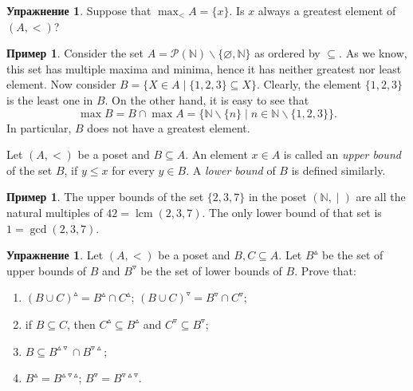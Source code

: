 \documentclass[12pt,notitlepage]{article}
\theoremstyle{plain}
\theoremstyle{definition}
\newtheorem{exc}[thm]{Упражнение}
\newtheorem{exm}[thm]{Пример}
\theoremstyle{plain}
\newcommand{\N}{\mathbb{N}}
\newcommand{\sbs}{\subseteq}
\renewcommand{\setminus}{\smallsetminus}
\newcommand{\void}{\varnothing}
\newcommand{\mP}{\mathcal{P}}
\newcommand{\1}{\mathbf{1}}
\newcommand{\0}{\mathbf{0}}
\newcommand{\dvd}{\mathop{\mid}}
\DeclareMathOperator{\lcm}{lcm}
\begin{document}
%
\begin{exc}
	Suppose that $\max_{<} A = \{x\}$. Is $x$ always a greatest element of $(A, <)$?
\end{exc}

\begin{exm}
	Consider the set $A = \mP(\N) \setminus \{\void, \N\}$ as ordered by ${\sbs}$. As we know, this set has multiple maxima and minima, hence it has neither greatest nor least element. Now consider $B = \{ X \in A \mid \{1,2,3\} \sbs X \}$. Clearly, the element $\{1,2,3\}$ is the least one in $B$. On the other hand, it is easy to see that
	$$\max B = B \cap \max A = \{ \N \setminus \{ n \} \mid n \in \N \setminus \{1,2,3\} \}.$$
	In particular, $B$ does not have a greatest element.
\end{exm}

Let $(A, <)$ be a poset and $B \sbs A$. An element $x \in A$ is called an \emph{upper bound} of the set $B$, if $y \leq x$ for every $y \in B$. A \emph{lower bound} of $B$ is defined similarly.

\begin{exm}
	The upper bounds of the set $\{2,3,7\}$ in the poset $(\N, {\dvd})$ are all the natural multiples of $42 = \lcm(2,3,7)$. The only lower bound of that set is $1 = \gcd(2,3,7)$.
\end{exm}
\begin{exc}
	Let $(A, <)$ be a poset and $B,C \sbs A$. Let $B^\vartriangle$ be the set of upper bounds of $B$ and $B^\triangledown$ be the set of lower bounds of $B$. Prove that:
	\begin{enumerate}
		\item $(B \cup C)^\vartriangle = B^\vartriangle \cap C^\vartriangle$; $(B \cup C)^\triangledown = B^\triangledown \cap C^\triangledown$;
		\item if $B \sbs C$, then $C^\vartriangle \sbs B^\vartriangle$ and $C^\triangledown \sbs B^\triangledown$;
		\item $B \sbs B^{\vartriangle \triangledown} \cap B^{\triangledown \vartriangle}$;
		\item $B^\vartriangle = B^{\vartriangle \triangledown \vartriangle}$; $B^\triangledown = B^{\triangledown \vartriangle \triangledown}$.
	\end{enumerate}
\end{exc}
\end{document}
